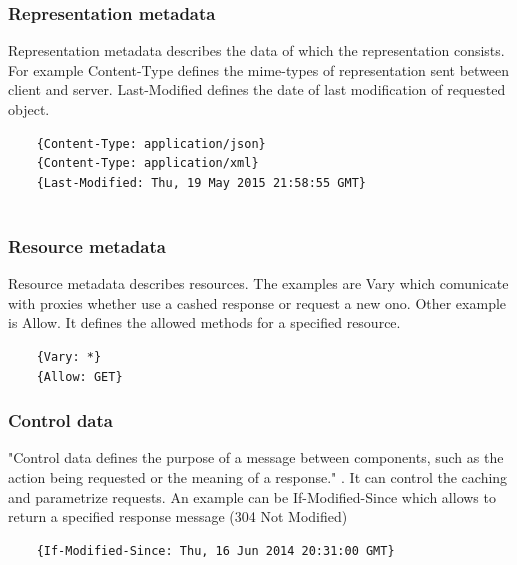 \subsubsection{Representation metadata}
  Representation metadata describes the data of which the representation consists. For example Content-Type defines the \gls{mime-types} of representation sent between client and server. Last-Modified defines the date of last modification of requested object.

  \begin{center}
  \begin{lstlisting}
    {Content-Type: application/json}
    {Content-Type: application/xml}
    {Last-Modified: Thu, 19 May 2015 21:58:55 GMT}
    
  \end{lstlisting}
  \end{center}
  
\subsubsection{Resource metadata}
  Resource metadata describes resources. The examples are Vary which comunicate with proxies whether use a cashed response or request a new ono. Other example is Allow. It defines the allowed methods for a specified resource.
  
  \begin{center}
  \begin{lstlisting}
    {Vary: *}
    {Allow: GET}
  \end{lstlisting}
  \end{center}
  
\subsubsection{Control data}
  "Control data defines the purpose of a message between components, such as the action being requested or the meaning of a response." \cite{fielding}. It can control the caching and parametrize requests. An example can be If-Modified-Since which allows to return a specified response message (304 Not Modified)
  
  \begin{center}
  \begin{lstlisting}
    {If-Modified-Since: Thu, 16 Jun 2014 20:31:00 GMT}
  \end{lstlisting}
  \end{center}
  
  

